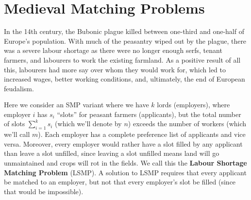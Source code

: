 \section{Medieval Matching Problems}

In the 14th century, the Bubonic plague killed between one-third and one-half of Europe's population. With much of the peasantry wiped out by the plague, there was a severe labour shortage as there were no longer enough serfs, tenant farmers, and labourers to work the existing farmland. As a positive result of all this, labourers had more say over whom they would work for, which led to increased wages, better working conditions, and, ultimately, the end of European feudalism.

Here we consider an SMP variant where we have $k$ lords (employers), where employer $i$ has $s_i$ ``slots'' for peasant farmers (applicants), but the total number of slots $\sum_{i=1}^k s_i$ (which we'll denote by $n$) exceeds the number of workers (which we'll call $m$). Each employer has a complete preference list of applicants and vice versa. Moreover, every employer would rather have a slot filled by any applicant than leave a slot unfilled, since leaving a slot unfilled means land will go unmaintained and crops will rot in the fields. We call this the \textbf{Labour Shortage Matching Problem} (LSMP). A solution to LSMP requires that every applicant be matched to an employer, but not that every employer's slot be filled (since that would be impossible).

